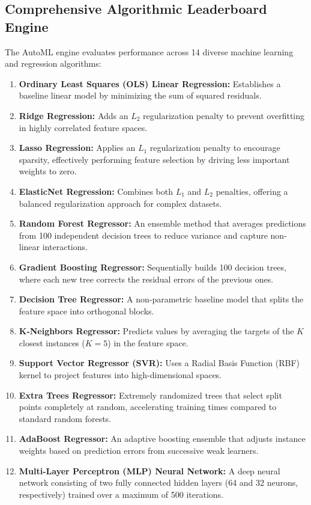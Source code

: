 \documentclass[11pt,a4paper,titlepage]{article}
\begin{document}
\subsection{Comprehensive Algorithmic Leaderboard Engine}
The AutoML engine evaluates performance across 14 diverse machine learning and regression algorithms:
\begin{enumerate}
    \item \textbf{Ordinary Least Squares (OLS) Linear Regression:} Establishes a baseline linear model by minimizing the sum of squared residuals.
    \item \textbf{Ridge Regression:} Adds an $L_2$ regularization penalty to prevent overfitting in highly correlated feature spaces.
    \item \textbf{Lasso Regression:} Applies an $L_1$ regularization penalty to encourage sparsity, effectively performing feature selection by driving less important weights to zero.
    \item \textbf{ElasticNet Regression:} Combines both $L_1$ and $L_2$ penalties, offering a balanced regularization approach for complex datasets.
    \item \textbf{Random Forest Regressor:} An ensemble method that averages predictions from 100 independent decision trees to reduce variance and capture non-linear interactions.
    \item \textbf{Gradient Boosting Regressor:} Sequentially builds 100 decision trees, where each new tree corrects the residual errors of the previous ones.
    \item \textbf{Decision Tree Regressor:} A non-parametric baseline model that splits the feature space into orthogonal blocks.
    \item \textbf{K-Neighbors Regressor:} Predicts values by averaging the targets of the $K$ closest instances ($K=5$) in the feature space.
    \item \textbf{Support Vector Regressor (SVR):} Uses a Radial Basis Function (RBF) kernel to project features into high-dimensional spaces.
    \item \textbf{Extra Trees Regressor:} Extremely randomized trees that select split points completely at random, accelerating training times compared to standard random forests.
    \item \textbf{AdaBoost Regressor:} An adaptive boosting ensemble that adjusts instance weights based on prediction errors from successive weak learners.
    \item \textbf{Multi-Layer Perceptron (MLP) Neural Network:} A deep neural network consisting of two fully connected hidden layers (64 and 32 neurons, respectively) trained over a maximum of 500 iterations.

\end{enumerate}
\end{document}
